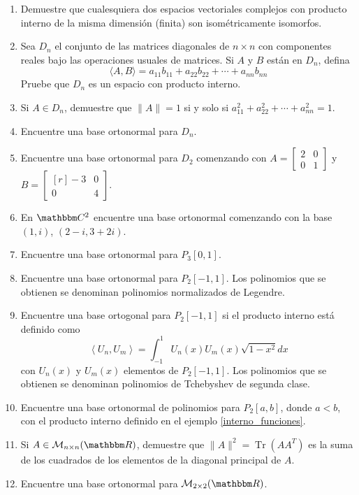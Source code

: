 \begin{enumerate}[start=62]
    \item Demuestre que cualesquiera dos espacios vectoriales complejos con producto interno de la misma dimensión (finita) son isométricamente isomorfos.
    \item Sea $D_{n}$ el conjunto de las matrices diagonales de $n \times n$ con componentes reales bajo las operaciones usuales de matrices. Si $A$ y $B$ están en $D_{n}$, defina
    $$\langle A, B \rangle = a_{11} b_{11}+a_{22} b_{22}+\cdots+a_{n n} b_{n n}$$
    Pruebe que $D_{n}$ es un espacio con producto interno.
    \item Si $A \in D_{n}$, demuestre que $\|A\|=1$ si y solo si $a_{11}^{2}+a_{22}^{2}+\cdots+a_{n n}^{2}=1$.
    \item Encuentre una base ortonormal para $D_{n}$.
    \item Encuentre una base ortonormal para $D_{2}$ comenzando con $A=\begin{bmatrix} 2 & 0 \\ 0 & 1 \end{bmatrix}$ y $B=\begin{bmatrix*}[r] -3 & 0 \\ 0 & 4 \end{bmatrix*}$.
    \item En $\CC[2]$ encuentre una base ortonormal comenzando con la base $(1, i)$, $(2-i, 3+2 i)$.
    \item Encuentre una base ortonormal para $P_{3}[0,1]$.
    \item Encuentre una base ortonormal para $P_{2}[-1,1]$. Los polinomios que se obtienen se denominan polinomios normalizados de Legendre.
    \item Encuentre una base ortogonal para $P_{2}[-1,1]$ si el producto interno está definido como
    $$\left\langle U_{n}, U_{m}\right\rangle = \int_{-1}^{1} U_{n}(x) U_{m}(x) \sqrt{1-x^{2}} d x$$
    con $U_{n}(x)$ y $U_{m}(x)$ elementos de $P_{2}[-1,1]$. Los polinomios que se obtienen se denominan polinomios de Tchebyshev de segunda clase.
    \item Encuentre una base ortonormal de polinomios para $P_{2}[a, b]$, donde $a<b$, con el producto interno definido en el ejemplo \ref{interno_funciones}.
    \item Si $A \in \mathcal{M}_{n \times n}(\RR)$, demuestre que $\|A\|^{2}=\operatorname{Tr}\left(A A^{T}\right)$ es la suma de los cuadrados de los elementos de la diagonal principal de $A$.
    \item Encuentre una base ortonormal para $\mathcal{M}_{2 \times 2}(\RR)$.

\end{enumerate}
